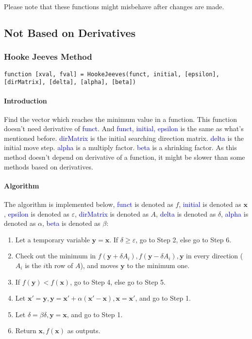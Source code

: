 \documentclass{article}
\begin{document}
Please note that these functions might misbehave after changes are made.

\subsection{Not Based on Derivatives}
\subsubsection{Hooke Jeeves Method}
\begin{verbatim}
function [xval, fval] = HookeJeeves(funct, initial, [epsilon], [dirMatrix], [delta], [alpha], [beta])
\end{verbatim}

\paragraph{Introduction}
Find the vector which reaches the minimum value in a function. This function doesn't need derivative of \textcolor{blue}{funct}. And \textcolor{blue}{funct, initial, epsilon} is the same as what's mentioned before. \textcolor{blue}{dirMatrix} is the initial searching direction matrix. \textcolor{blue}{delta} is the initial move step. \textcolor{blue}{alpha} is a multiply factor. \textcolor{blue}{beta} is a shrinking factor. As this method doesn't depend on derivative of a function, it might be slower than some methods based on derivatives.

\paragraph{Algorithm}
The algorithm is implemented below, \textcolor{blue}{funct} is denoted as $f$, \textcolor{blue}{initial} is denoted as $\mathbf{x}$, \textcolor{blue}{epsilon} is denoted as $\varepsilon$, \textcolor{blue}{dirMatrix} is denoted as $A$, \textcolor{blue}{delta} is denoted as $\delta$, \textcolor{blue}{alpha} is denoted as $\alpha$, \textcolor{blue}{beta} is denoted as $\beta$:
\begin{enumerate}
    \item Let a temporary variable $\mathbf{y} = \mathbf{x}$. If $\delta \geqslant \varepsilon$, go to Step 2, else go to Step 6.
    \item Check out the minimum in $f(\mathbf{y} + \delta A_i), f(\mathbf{y} - \delta A_i), \mathbf{y}$ in every direction ($A_i$ is the $i$th row of $A$), and moves $\mathbf{y}$ to the minimum one.
    \item If $f(\mathbf{y}) < f(\mathbf{x})$, go to Step 4, else go to Step 5.
    \item Let $\mathbf{x'} = \mathbf{y}, \mathbf{y} = \mathbf{x'} + \alpha(\mathbf{x'} - \mathbf{x}), \mathbf{x} = \mathbf{x'}$, and go to Step 1.
    \item Let $\delta = \beta \delta, \mathbf{y} = \mathbf{x}$, and go to Step 1.
    \item Return $\mathbf{x}, f(\mathbf{x})$ as outputs.
\end{enumerate}
\end{document}
